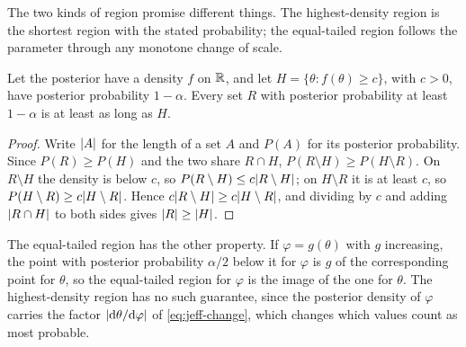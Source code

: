 The two kinds of region promise different things.
The highest-density region is the shortest region with the stated probability; the equal-tailed region follows the parameter through any monotone change of scale.

\begin{proposition}
\label{prop:hpd-shortest}
Let the posterior have a density $f$ on $\mathbb{R}$, and let $H = \{\theta : f(\theta) \geq c\}$, with $c > 0$, have posterior probability $1 - \alpha$. Every set $R$ with posterior probability at least $1 - \alpha$ is at least as long as $H$.
\end{proposition}

\begin{proof}
Write $\lvert A\rvert$ for the length of a set $A$ and $P(A)$ for its posterior probability. Since $P(R) \geq P(H)$ and the two share $R \cap H$, $P(R \setminus H) \geq P(H \setminus R)$. On $R \setminus H$ the density is below $c$, so $P(R \setminus H) \leq c\lvert R \setminus H\rvert$; on $H \setminus R$ it is at least $c$, so $P(H \setminus R) \geq c\lvert H \setminus R\rvert$. Hence $c\lvert R \setminus H\rvert \geq c\lvert H \setminus R\rvert$, and dividing by $c$ and adding $\lvert R \cap H\rvert$ to both sides gives $\lvert R\rvert \geq \lvert H\rvert$.
\end{proof}

The equal-tailed region has the other property.
If $\varphi = g(\theta)$ with $g$ increasing, the point with posterior probability $\alpha/2$ below it for $\varphi$ is $g$ of the corresponding point for $\theta$, so the equal-tailed region for $\varphi$ is the image of the one for $\theta$.
The highest-density region has no such guarantee, since the posterior density of $\varphi$ carries the factor $\lvert\mathrm{d}\theta/\mathrm{d}\varphi\rvert$ of \cref{eq:jeff-change}, which changes which values count as most probable.

